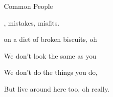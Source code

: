 \begin{song}{Common People}{
	
	\chordset[Intro]{ \CMaj \CMajsusFour }
	
}
	 \begin{songverse}
		, mistakes, misfits. 

		 on a diet of broken biscuits, oh 

		We don't look the same as you 
		
		We don't do the things you do,
		
		But  live around here too, oh really. 
	 \end{songverse}

\end{song}